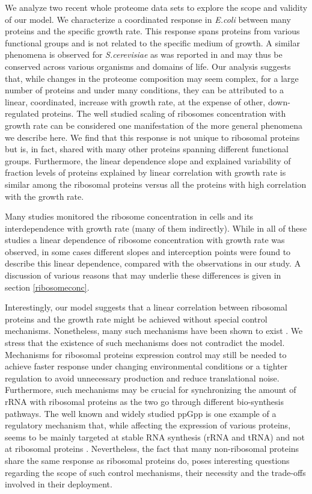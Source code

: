 \documentclass{article}
\begin{document}
We analyze two recent whole proteome data sets to explore the scope and validity of our model.
We characterize a coordinated response in \emph{E.coli} between many proteins and the specific growth rate.
This response spans proteins from various functional groups and is not related to the specific medium of growth.
A similar phenomena is observed for \emph{S.cerevisiae} as was reported in \cite{Keren2013} and may thus be conserved across various organisms and domains of life.
Our analysis suggests that, while changes in the proteome composition may seem complex, for a large number of proteins and under many conditions, they can be attributed to a linear, coordinated, increase with growth rate, at the expense of other, down-regulated proteins.
The well studied scaling of ribosomes concentration with growth rate can be considered one manifestation of the more general phenomena we describe here.
We find that this response is not unique to ribosomal proteins but is, in fact, shared with many other proteins spanning different functional groups.
Furthermore, the linear dependence slope and explained variability of fraction levels of proteins explained by linear correlation with growth rate is similar among the ribosomal proteins versus all the proteins with high correlation with the growth rate.

Many studies monitored the ribosome concentration in cells and its interdependence with growth rate \cite{Schaechter1958,Bremer1987,Zaslaver2009,Scott2010,Valgepea2013,Peebo_2015,Hui_2015}(many of them indirectly).
While in all of these studies a linear dependence of ribosome concentration with growth rate was observed, in some cases different slopes and interception points were found to describe this linear dependence, compared with the observations in our study.
A discussion of various reasons that may underlie these differences is given in section \ref{ribosomeconc}.

Interestingly, our model suggests that a linear correlation between ribosomal proteins and the growth rate might be achieved without special control mechanisms.
Nonetheless, many such mechanisms have been shown to exist \cite{Nomura1984,Scott2014}.
We stress that the existence of such mechanisms does not contradict the model.
Mechanisms for ribosomal proteins expression control may still be needed to achieve faster response under changing environmental conditions or a tighter regulation to avoid unnecessary production and reduce translational noise.
Furthermore, such mechanisms may be crucial for synchronizing the amount of rRNA with ribosomal proteins as the two go through different bio-synthesis pathways.
The well known and widely studied ppGpp is one example of a regulatory mechanism that, while affecting the expression of various proteins, seems to be mainly targeted at stable RNA synthesis (rRNA and tRNA) and not at ribosomal proteins \cite{Srivatsan2008}.
Nevertheless, the fact that many non-ribosomal proteins share the same response as ribosomal proteins do, poses interesting questions regarding the scope of such control mechanisms, their necessity and the trade-offs involved in their deployment.
\end{document}
